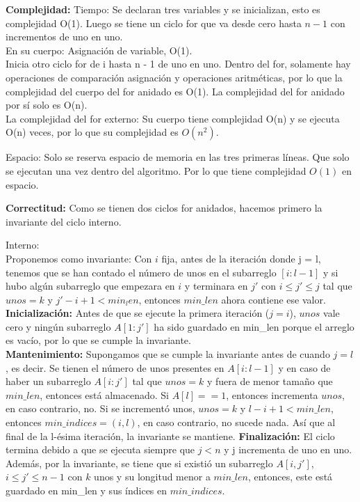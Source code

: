 \documentclass[12pt]{article}
\begin{document}
\begin{itemize}
    \textbf{Complejidad:}
    Tiempo: Se declaran tres variables y se inicializan, esto es complejidad O(1).
    Luego se tiene un ciclo for que va desde cero hasta $n - 1$ con incrementos de uno en uno.\\
    En su cuerpo:
    Asignación de variable, O(1).\\
    Inicia otro ciclo for de i hasta n - 1 de uno  en uno.
    Dentro del for, solamente hay operaciones de comparación asignación y operaciones aritméticas, por lo que la complejidad del cuerpo del for anidado es O(1). La complejidad del for anidado por sí solo es O(n).\\La complejidad del for externo: Su cuerpo tiene complejidad O(n) y se ejecuta O(n) veces, por lo que su complejidad es $O(n^2)$.

    Espacio: Solo se reserva espacio de memoria en las tres primeras líneas. Que solo se ejecutan una vez dentro del algoritmo. Por lo que tiene complejidad $O(1)$ en espacio.

    \textbf{Correctitud:} Como se tienen dos ciclos for anidados, hacemos primero la invariante del ciclo interno.

    Interno:\\
    Proponemos como invariante: Con $i$ fija, antes de la iteración donde j = l, tenemos que se han contado el número de unos en el subarreglo $[i:l - 1]$ y si hubo algún subarreglo que empezara en $i$ y terminara en $j'$ con $i \leq j' \leq j$ tal que $unos = k$ y $j' - i + 1 < min_len$, entonces $min\_len$ ahora contiene ese valor.
    \textbf{Inicialización:} Antes de que se ejecute la primera iteración ($j = i$), $unos$ vale cero y ningún subarreglo $A[1:j']$ ha sido guardado en min\_len porque el arreglo es vacío, por lo que se cumple la invariante.\\
    \textbf{Mantenimiento:} Supongamos que se cumple la invariante antes de cuando $j = l$, es decir. Se tienen el número de unos presentes en $A[i:l-1]$ y en caso de haber un subarreglo $A[i:j']$ tal que $unos = k$ y fuera de menor tamaño que $min\_len$, entonces está almacenado.
    Si $A[l] == 1$, entonces incrementa $unos$, en caso contrario, no.
    Si se incrementó unos, $unos = k$ y $l - i + 1 < min\_len$, entonces $min\_indices = (i, l)$, en caso contrario, no sucede nada. Así que al final de la
    l-ésima iteración, la invariante se mantiene.
    \textbf{Finalización:} El ciclo termina debido a que se ejecuta siempre que $j < n$ y j incrementa de uno en uno.
    Además, por la invariante, se tiene que si existió un subarreglo $A[i, j']$, $i \leq j' \leq n - 1$ con $k$ unos y su longitud menor a $min\_len$, entonces, este está guardado en min\_len y sus índices en $min\_indices$.


\end{itemize}
\end{document}
